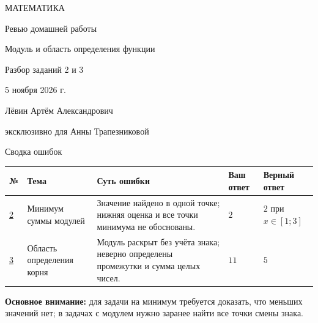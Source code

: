 \documentclass[a4paper,12pt]{article}
\begin{document}
\thispagestyle{empty}
\begin{center}
\vspace*{34mm}
{\color{accent}\large МАТЕМАТИКА}\par
\vspace{19mm}
{\fontsize{24}{29}\selectfont\color{ink}Ревью домашней работы}\par
\vspace{12mm}
{\large\color{accent}Модуль и область определения функции}\par
\vspace{5mm}
{\normalsize Разбор заданий 2 и 3}\par
\vfill
{\normalsize 5 ноября 2026 г.}\par
\vspace{12mm}
{\normalsize Лёвин Артём Александрович}\par
{\small эксклюзивно для Анны Трапезниковой}\par
\vspace{27mm}
\vspace{9mm}
\end{center}
\clearpage

\begin{center}
{\LARGE\color{ink}Сводка ошибок}\par
\vspace{7mm}
\end{center}
\small
\renewcommand{\arraystretch}{1.38}
\begin{tabularx}{\linewidth}{@{}p{11mm}p{27mm}X p{21mm}p{27mm}@{}}
\toprule
\textbf{№} & \textbf{Тема} & \textbf{Суть ошибки} & \textbf{Ваш ответ} & \textbf{Верный ответ}\\
\midrule
\hyperref[task:2]{2} & Минимум суммы модулей & Значение найдено в одной точке; нижняя оценка и все точки минимума не обоснованы. & $2$ & $2$ при $x\in[1;3]$\\
\addlinespace
\hyperref[task:3]{3} & Область определения корня & Модуль раскрыт без учёта знака; неверно определены промежутки и сумма целых чисел. & $11$ & $5$\\
\bottomrule
\end{tabularx}
\normalsize
\vspace{8mm}
\textcolor{keyblue}{\textbf{Основное внимание:}} для задачи на минимум требуется доказать, что меньших значений нет; в задачах с модулем нужно заранее найти все точки смены знака.
\clearpage
\end{document}
